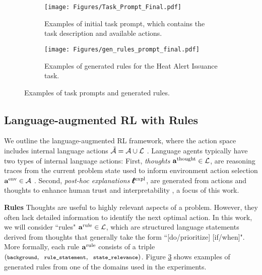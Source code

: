  





\begin{figure}[tbp]
    \centering
    \begin{subfigure}[b]{\linewidth}
\texttt{[image: Figures/Task\_Prompt\_Final.pdf]}
    \caption{Examples of initial task prompt, which contains the task description and available actions. }
    \label{fig:input_prompt}   
    \end{subfigure}
     \begin{subfigure}[b]{\linewidth}\texttt{[image: Figures/gen\_rules\_prompt\_final.pdf]}
    \caption{Examples of generated rules for the Heat Alert Issuance task.}
    \label{fig:rule_prompt}   
    \end{subfigure}
    \vskip -4pt
    \caption{Examples of task prompts and generated rules.}
    \vspace{-0.6cm}
\end{figure}

 



\subsection{Language-augmented RL with Rules}


We outline the language-augmented RL framework, where the action space includes internal language actions $\tilde{{\mathcal{A}}}={\mathcal{A}} \cup {\mathcal{L}}$ \cite{yao2023react, carta2023grounding}. Language agents typically have two types of internal language actions: First, \emph{thoughts} ${\mathbf{a}}^{\text{thought}} \in {\mathcal{L}}$, are reasoning traces from the current problem state used to inform environment action selection ${\mathbf{a}}^{\text{env}} \in {\mathcal{A}}$ \cite{yao2023react}. Second, \emph{post-hoc explanations} $\pmb{\ell}^{\text{expl}}$, are generated from actions and thoughts to enhance human trust and interpretability \cite{zhang2023understanding}, a focus of this work.

\textbf{Rules}\quad
Thoughts are useful to highly relevant aspects of a problem. However, they often lack detailed information to identify the next optimal action. In this work, we will consider ``rules" ${\mathbf{a}}^{\text{rule}}\in {\mathcal{L}}$, which are structured language statements derived from thoughts that generally take the form ``[do/prioritize] [if/when]". More formally, each rule ${\mathbf{a}}^{\text{rule}}$ consists of a triple $(\texttt{\footnotesize background}, \texttt{\footnotesize\, rule\_statement}, \texttt{\footnotesize\, state\_relevance})$. Figure \ref{fig:rule_prompt} shows examples of generated rules from one of the domains used in the experiments.



